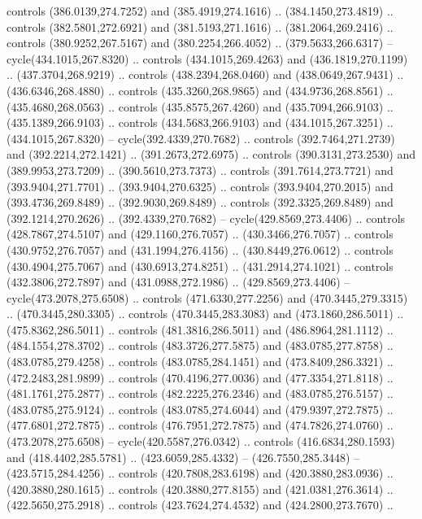 \begin{scope}[cm={{1.25,0.0,0.0,-1.25,(0.0,743.43331)}}]
    controls (386.0139,274.7252) and (385.4919,274.1616) .. (384.1450,273.4819) ..
    controls (382.5801,272.6921) and (381.5193,271.1616) .. (381.2064,269.2416) ..
    controls (380.9252,267.5167) and (380.2254,266.4052) .. (379.5633,266.6317) --
    cycle(434.1015,267.8320) .. controls (434.1015,269.4263) and
    (436.1819,270.1199) .. (437.3704,268.9219) .. controls (438.2394,268.0460) and
    (438.0649,267.9431) .. (436.6346,268.4880) .. controls (435.3260,268.9865) and
    (434.9736,268.8561) .. (435.4680,268.0563) .. controls (435.8575,267.4260) and
    (435.7094,266.9103) .. (435.1389,266.9103) .. controls (434.5683,266.9103) and
    (434.1015,267.3251) .. (434.1015,267.8320) -- cycle(392.4339,270.7682) ..
    controls (392.7464,271.2739) and (392.2214,272.1421) .. (391.2673,272.6975) ..
    controls (390.3131,273.2530) and (389.9953,273.7209) .. (390.5610,273.7373) ..
    controls (391.7614,273.7721) and (393.9404,271.7701) .. (393.9404,270.6325) ..
    controls (393.9404,270.2015) and (393.4736,269.8489) .. (392.9030,269.8489) ..
    controls (392.3325,269.8489) and (392.1214,270.2626) .. (392.4339,270.7682) --
    cycle(429.8569,273.4406) .. controls (428.7867,274.5107) and
    (429.1160,276.7057) .. (430.3466,276.7057) .. controls (430.9752,276.7057) and
    (431.1994,276.4156) .. (430.8449,276.0612) .. controls (430.4904,275.7067) and
    (430.6913,274.8251) .. (431.2914,274.1021) .. controls (432.3806,272.7897) and
    (431.0988,272.1986) .. (429.8569,273.4406) -- cycle(473.2078,275.6508) ..
    controls (471.6330,277.2256) and (470.3445,279.3315) .. (470.3445,280.3305) ..
    controls (470.3445,283.3083) and (473.1860,286.5011) .. (475.8362,286.5011) ..
    controls (481.3816,286.5011) and (486.8964,281.1112) .. (484.1554,278.3702) ..
    controls (483.3726,277.5875) and (483.0785,277.8758) .. (483.0785,279.4258) ..
    controls (483.0785,284.1451) and (473.8409,286.3321) .. (472.2483,281.9899) ..
    controls (470.4196,277.0036) and (477.3354,271.8118) .. (481.1761,275.2877) ..
    controls (482.2225,276.2346) and (483.0785,276.5157) .. (483.0785,275.9124) ..
    controls (483.0785,274.6044) and (479.9397,272.7875) .. (477.6801,272.7875) ..
    controls (476.7951,272.7875) and (474.7826,274.0760) .. (473.2078,275.6508) --
    cycle(420.5587,276.0342) .. controls (416.6834,280.1593) and
    (418.4402,285.5781) .. (423.6059,285.4332) -- (426.7550,285.3448) --
    (423.5715,284.4256) .. controls (420.7808,283.6198) and (420.3880,283.0936) ..
    (420.3880,280.1615) .. controls (420.3880,277.8155) and (421.0381,276.3614) ..
    (422.5650,275.2918) .. controls (423.7624,274.4532) and (424.2800,273.7670) ..

\end{scope}
